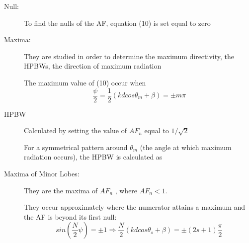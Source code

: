 \documentclass{beamer}
\begin{document}
	\begin{frame}
		\begin{description}
			\item[Null:] To find the nulls of the AF, equation (10) is set equal to zero
			\item[Maxima:] They are studied in order to determine the maximum directivity, the HPBWs,	the direction of maximum radiation
			\item[] The maximum value of (10) occur	when
			\begin{equation}
			\dfrac{\psi}{2} = \dfrac{1}{2}(kdcos\theta_m +\beta) = \pm m\pi \nonumber
			\end{equation}
		\end{description}
	\end{frame}
	\begin{frame}
		\begin{description}
			\item[HPBW] Calculated by setting the value of $ AF_n $ equal to $1/\sqrt{2}$
			\boxedeq{}{\theta _h& = cos^{-1}\left[\dfrac{\lambda}{2\pi d}\left(-\beta \pm \dfrac{2.782}{N}\right)\right]}
			\item[] For a symmetrical pattern around $ \theta_m $ (the angle at which maximum radiation occurs), the HPBW is calculated as
			\boxedeq{}{\Theta _h& =2|\theta_h - \theta_m|}
			\item[Maxima of Minor Lobes:] They are the maxima of $ AF_n $ , where $ AF_n < 1 $. 
			\item[] They occur approximately
			where the numerator attains a maximum and the AF is beyond its first null:
			\begin{equation}
			sin\left(\dfrac{N}{2}\psi\right) = \pm 1\Rightarrow \dfrac{N}{2}(kdcos\theta_s +\beta) = \pm (2s+1)\frac{\pi}{2}\nonumber
			\end{equation}
		\end{description}
	\end{frame}
	
\end{document}
